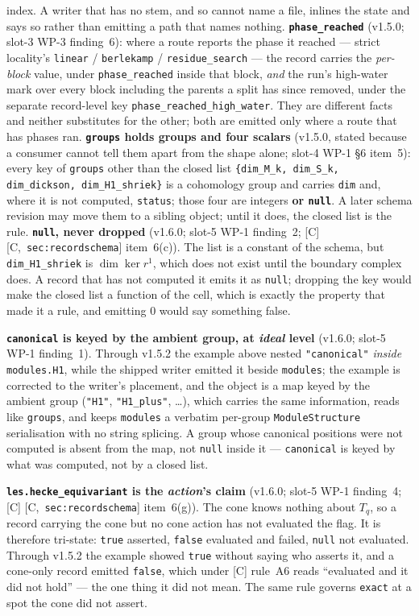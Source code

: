 \documentclass[11pt]{article}
\theoremstyle{remark}
\newcommand{\HA}[1]{[C,~\texttt{#1}]}      %
\begin{document}
index. A writer that has no stem, and so cannot name a file, inlines the state and says so
rather than emitting a path that names nothing.
\textbf{\texttt{phase\_reached}} (v1.5.0; slot-3 WP-3 finding~6): where a route reports the
phase it reached --- strict locality's \texttt{linear} / \texttt{berlekamp} /
\texttt{residue\_search} --- the record carries the \emph{per-block} value, under
\texttt{phase\_reached} inside that block, \emph{and} the run's high-water mark over every
block including the parents a split has since removed, under the separate record-level key
\texttt{phase\_reached\_high\_water}. They are different facts and neither substitutes for
the other; both are emitted only where a route that has phases ran.
\textbf{\texttt{groups} holds groups and four scalars} (v1.5.0, stated because a consumer
cannot tell them apart from the shape alone; slot-4 WP-1 \S6 item~5): every key of
\texttt{groups} other than the closed list \texttt{\{dim\_M\_k, dim\_S\_k, dim\_dickson,
dim\_H1\_shriek\}} is a cohomology group and carries \texttt{dim} and, where it is not
computed, \texttt{status}; those four are integers \textbf{or \texttt{null}}. A later
schema revision may move them to a sibling object; until it does, the closed list is the
rule.
\textbf{\texttt{null}, never dropped} (v1.6.0; slot-5 WP-1 finding~2; [C]
\HA{sec:recordschema} item~6(c)). The list is a constant of the schema, but
\texttt{dim\_H1\_shriek} is $\dim\ker r^{1}$, which does not exist until the boundary
complex does. A record that has not computed it emits it as \texttt{null}; dropping the
key would make the closed list a function of the cell, which is exactly the property that
made it a rule, and emitting $0$ would say something false.

\textbf{\texttt{canonical} is keyed by the ambient group, at \emph{ideal} level}
(v1.6.0; slot-5 WP-1 finding~1). Through v1.5.2 the example above nested
\texttt{"canonical"} \emph{inside} \texttt{modules.H1}, while the shipped writer emitted it
beside \texttt{modules}; the example is corrected to the writer's placement, and the object
is a map keyed by the ambient group (\texttt{"H1"}, \texttt{"H1\_plus"}, \ldots), which
carries the same information, reads like \texttt{groups}, and keeps \texttt{modules} a
verbatim per-group \texttt{ModuleStructure} serialisation with no string splicing. A group
whose canonical positions were not computed is absent from the map, not \texttt{null}
inside it --- \texttt{canonical} is keyed by what was computed, not by a closed list.

\textbf{\texttt{les.hecke\_equivariant} is the \emph{action}'s claim} (v1.6.0; slot-5 WP-1
finding~4; [C] \HA{sec:recordschema} item~6(g)). The cone knows nothing about $T_q$, so a
record carrying the cone but no cone action has not evaluated the flag. It is therefore
tri-state: \texttt{true} asserted, \texttt{false} evaluated and failed, \texttt{null} not
evaluated. Through v1.5.2 the example showed \texttt{true} without saying who asserts it,
and a cone-only record emitted \texttt{false}, which under [C] rule~A6 reads ``evaluated
and it did not hold'' --- the one thing it did not mean. The same rule governs
\texttt{exact} at a spot the cone did not assert.
\end{document}
